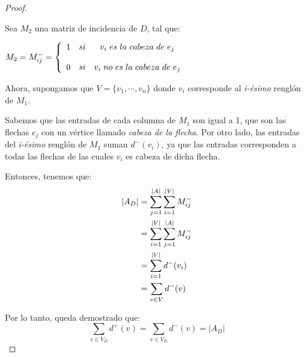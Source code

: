 \documentclass{article}
\begin{document}
\begin{enumerate}
\begin{proof}
\begin{itemize}
      Sea $M_{2}$ una matriz de incidencia de $D$, tal que:
      \begin{center}
        $M_{2} = M^{-}_{ij}
        = \left \{ 
        \begin{array}{lcc}
          1 &   si  & v_{i} \hspace{0.3em} es \hspace{0.3em} la \hspace{0.3em}
          cabeza \hspace{0.3em} de \hspace{0.3em} e_{j} \\
          \\0 &  si & v_{i} \hspace{0.3em} no \hspace{0.3em} es \hspace{0.3em}
          la \hspace{0.3em} cabeza \hspace{0.3em} de \hspace{0.3em} e_{j}
        \end{array}
        \right.$
      \end{center}
      Ahora, supongamos que $V = \{v_{1}, \cdots, v_{n}\}$ donde $v_{i}$
      corresponde al \textit{i-ésimo} renglón de $M_{1}$.
      
      Sabemos que las entradas de cada columna de $M_{1}$ son igual a 1,
      que son las flechas $e_{j}$ con un vértice llamado \textit{cabeza de la flecha}.
      Por otro lado, las entradas del \textit{i-ésimo} renglón de $M_{1}$
      suman $d^{-}(v_{i})$, ya que las entradas corresponden a todas las
      flechas de las cuales $v_{i}$ es cabeza de dicha flecha. 
      
      Entonces, tenemos que:
      \begin{equation*}
        \begin{split}
          \abs{A_{D}} & = \sum_{j=1}^{\abs{A}} \sum_{i=1}^{\abs{V}} M^{-}_{ij} \\
          & = \sum_{i=1}^{\abs{V}} \sum_{j=1}^{\abs{A}} M^{-}_{ij} \\
          & = \sum_{i=1}^{\abs{V}} d^{-}(v_{i}) \\
          & = \sum_{v \in V} d^{-}(v)
        \end{split}
      \end{equation*}
    \end{itemize}
    Por lo tanto, queda demostrado que:
    \[
    \displaystyle \sum_{v \in V_D} d^+(v) = \sum_{v \in V_D} d^-(v) = |A_D|
    \]
  \end{proof}


\end{enumerate}
\end{document}
